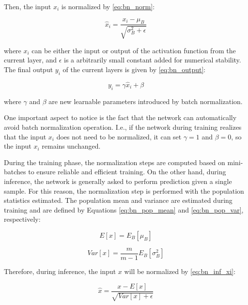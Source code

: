 Then, the input $x_i$ is normalized by \autoref{eq:bn_norm}:

\begin{equation}
\label{eq:bn_norm}
\hat{x}_i = \frac{x_i - \mu_B}{\sqrt{\sigma_B^{2} + \epsilon}}
\end{equation}

\noindent
where $x_i$ can be either the input or output of the activation function from the current layer, and $\epsilon$ is a arbitrarily small constant added for numerical stability. The final output $y_i$ of the current layers is given by \autoref{eq:bn_output}:

\begin{equation}
\label{eq:bn_output}
y_i = \gamma\hat{x}_i + \beta
\end{equation}

\noindent
where $\gamma$ and $\beta$ are new learnable parameters introduced by batch normalization. 

One important aspect to notice is the fact that the network can automatically avoid batch normalization operation. I.e., if the network during training realizes that the input $x_i$ does not need to be normalized, it can set $\gamma=1$ and $\beta=0$, so the input $x_i$ remains unchanged.

During the training phase, the normalization steps are computed based on mini-batches to ensure reliable and efficient training. On the other hand, during inference, the network is generally asked to perform prediction given a single sample. For this reason, the normalization step is performed with the population statistics estimated. The population mean and variance are estimated during training and are defined by Equations \ref{eq:bn_pop_mean} and \ref{eq:bn_pop_var}, respectively: 

\begin{equation}
\label{eq:bn_pop_mean}
E[x] = E_B[\mu_B]
\end{equation}

\begin{equation}
\label{eq:bn_pop_var}
Var[x] = \frac{m}{m-1} E_B[\sigma_B^{2}]
\end{equation}

Therefore, during inference, the input $x$ will be normalized by \autoref{eq:bn_inf_xi}:

\begin{equation}
\label{eq:bn_inf_xi}
\hat{x} = \frac{x - E[x]}{\sqrt{Var[x] + \epsilon}}
\end{equation}

